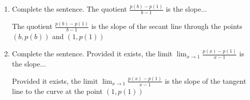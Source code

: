 \documentclass[nooutcomes, handout]{ximera}
\begin{document}
\begin{problem}
\begin{enumerate}
\begin{freeResponse}
		\end{freeResponse}

		\item Complete the sentence.  The quotient $\frac{p(b)-p(1)}{b-1}$ is the slope...

		\begin{freeResponse}
			The quotient $\frac{p(b)-p(1)}{b-1}$ is the slope of the secant line through the points $(b,p(b))$ and $(1,p(1))$
		\end{freeResponse}

		\item Complete the sentence.  Provided it exists, the limit $\lim_{x \to 1}\frac{p(x)-p(1)}{x-1}$ is the slope...
		\begin{freeResponse}
			 Provided it exists, the limit $\lim_{x \to 1}\frac{p(x)-p(1)}{x-1}$ is the slope of the tangent line to the curve at the point $(1,p(1))$
		\end{freeResponse}
	\end{enumerate}
\end{problem}
\end{document}

